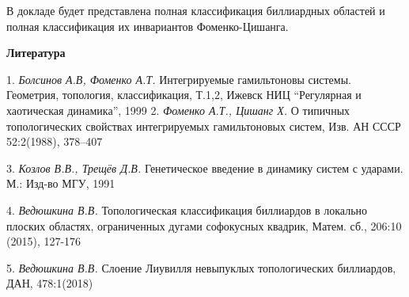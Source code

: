  В докладе будет представлена полная классификация биллиардных областей и полная классификация их инвариантов Фоменко-Цишанга.



\smallskip \centerline{\bf Литература}\nopagebreak



1. {\it Болсинов А.В, Фоменко А.Т.} Интегрируемые гамильтоновы системы.
Геометрия, топология, классификация, Т.1,2,
   Ижевск
   НИЦ ``Регулярная и хаотическая динамика'',
  1999
2. {\it  Фоменко А.Т., Цишанг Х.} О типичных топологических свойствах
интегрируемых гамильтоновых систем,  Изв. АН СССР
   52:2(1988),
  378--407


  3. {\it Козлов В.В., Трещёв Д.В.} Генетическое  введение в динамику систем с ударами. М.: Изд-во МГУ, 1991

4.  {\it Ведюшкина В.В.} Топологическая классификация биллиардов в локально плоских областях,
ограниченных дугами софокусных квадрик, Матем. сб., 206:10 (2015), 127-176

  5. {\it Ведюшкина В.В.} Слоение Лиувилля невыпуклых топологических биллиардов, ДАН, 478:1(2018)

